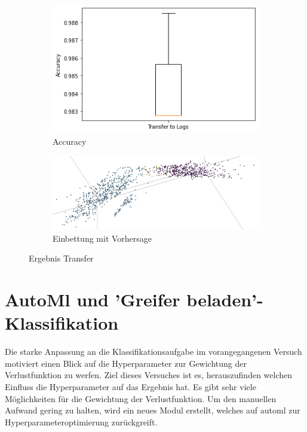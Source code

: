 		 \begin{figure}[h]
			\centering
			\begin{subfigure}[c]{0.49\textwidth}			
				\includegraphics[width=1\textwidth,center]{bilder/Hauptteil/Transfer_Logs/Acc_Transfer_Logs.png}
				\caption{Accuracy}
				\label{img:AccuracyTransferLogs}	
			\end{subfigure}
			\begin{subfigure}[c]{0.49\textwidth}			
				\includegraphics[width=1\textwidth, center]{bilder/Hauptteil/Transfer_Logs/Logs_transfer_emb.png}
				\caption{Einbettung mit Vorhersage}
				\label{img:Einbettung_Logs_Vorhersage}	
			\end{subfigure}
			\caption{Ergebnis Transfer}
			\label{img:Ergebnis_Transfer}
		\end{figure}
	
		
	\section{AutoMl und 'Greifer beladen'-Klassifikation}
	\label{sec:Transfer_autoMl}
	Die starke Anpassung an die Klassifikationsaufgabe im vorangegangenen Versuch motiviert einen Blick auf die Hyperparameter zur Gewichtung der Verlustfunktion zu werfen. Ziel dieses Versuches ist es, herauszufinden welchen Einfluss die Hyperparameter auf das Ergebnis hat. Es gibt sehr viele Möglichkeiten für die Gewichtung der Verlustfunktion. Um den manuellen Aufwand gering zu halten, wird ein neues Modul erstellt, welches auf \ac{automl} zur Hyperparameteroptimierung zurückgreift.
